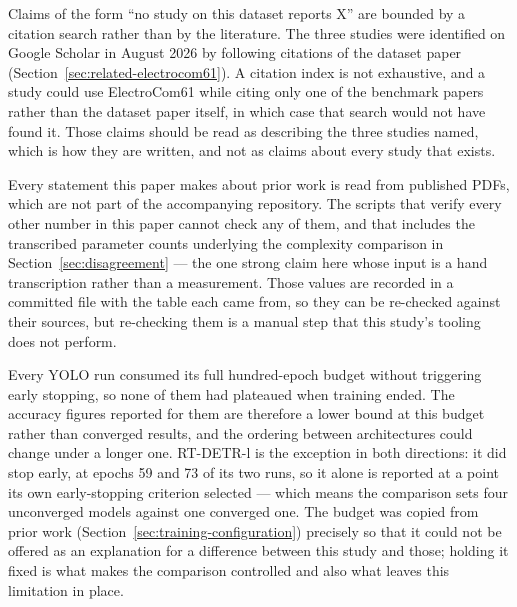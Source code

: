 Claims of the form ``no study on this dataset reports X'' are bounded by a
citation search rather than by the literature. The three studies were identified
on Google Scholar in August 2026 by following citations of the dataset paper
(Section~\ref{sec:related-electrocom61}). A citation index is not exhaustive,
and a study could use ElectroCom61 while citing only one of the benchmark papers
rather than the dataset paper itself, in which case that search would not have
found it. Those claims should be read as describing the three studies named,
which is how they are written, and not as claims about every study that exists.

Every statement this paper makes about prior work is read from published PDFs,
which are not part of the accompanying repository. The scripts that verify every
other number in this paper cannot check any of them, and that includes the
transcribed parameter counts underlying the complexity comparison in
Section~\ref{sec:disagreement} --- the one strong claim here whose input is a
hand transcription rather than a measurement. Those values are recorded in a
committed file with the table each came from, so they can be re-checked against
their sources, but re-checking them is a manual step that this study's tooling
does not perform.

Every YOLO run consumed its full hundred-epoch budget without triggering early
stopping, so none of them had plateaued when training ended. The accuracy
figures reported for them are therefore a lower bound at this budget rather than
converged results, and the ordering between architectures could change under a
longer one. RT-DETR-l is the exception in both directions: it did stop early, at
epochs 59 and 73 of its two runs, so it alone is reported at a point its own
early-stopping criterion selected --- which means the comparison sets four
unconverged models against one converged one. The budget was copied from prior work
(Section~\ref{sec:training-configuration}) precisely so that it could not be
offered as an explanation for a difference between this study and those; holding
it fixed is what makes the comparison controlled and also what leaves this
limitation in place.
